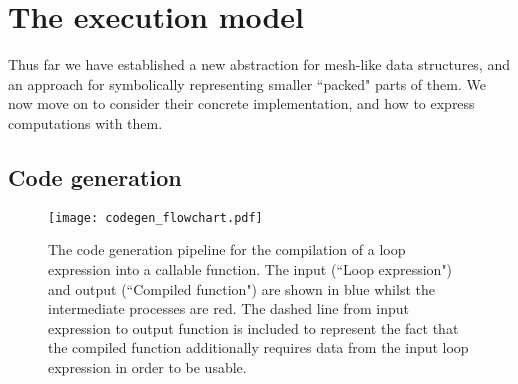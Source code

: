 \documentclass[thesis]{subfiles}
\begin{document}
\chapter{The execution model}
\label{chapter:execution_model}


Thus far we have established a new abstraction for mesh-like data structures, and an approach for symbolically representing smaller ``packed" parts of them.
We now move on to consider their concrete implementation, and how to express computations with them.

\section{Code generation}

\begin{figure}
  \centering
  \texttt{[image: codegen\_flowchart.pdf]}
  \caption{
    The code generation pipeline for the compilation of a loop expression into a callable function.
    The input (``Loop expression") and output (``Compiled function") are shown in blue whilst the intermediate processes are red.
    The dashed line from input expression to output function is included to represent the fact that the compiled function additionally requires data from the input loop expression in order to be usable.
  }
  \label{fig:codegen_flowchart}
\end{figure}



\end{document}
